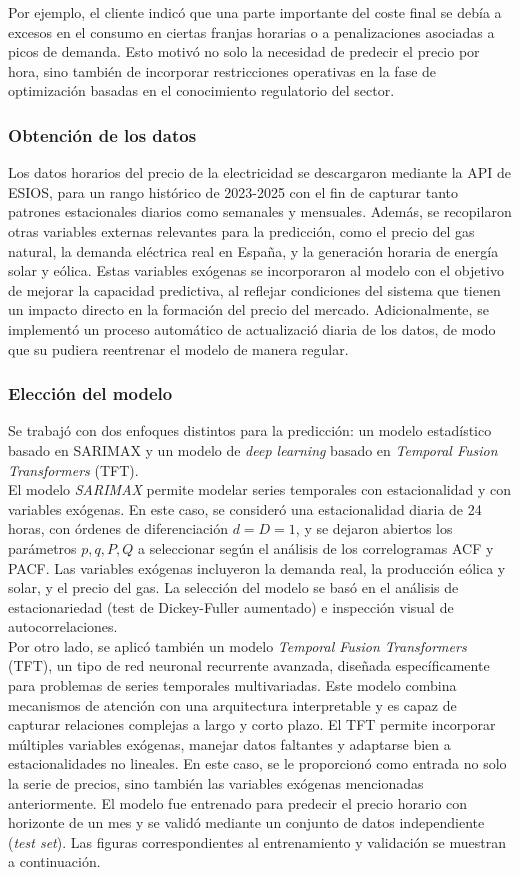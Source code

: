 Por ejemplo, el cliente indicó que una parte importante del coste final se debía a excesos en el consumo en ciertas franjas horarias o a penalizaciones asociadas a picos de demanda. Esto motivó no solo la necesidad de predecir el precio por hora, sino también de incorporar restricciones operativas en la fase de optimización basadas en el conocimiento regulatorio del sector.
%
%
%
\subsubsection{Obtención de los datos}
%
%
%
Los datos horarios del precio de la electricidad se descargaron mediante la API de ESIOS, para un rango histórico de 2023-2025 con el fin de capturar tanto patrones estacionales diarios como semanales y mensuales. Además, se recopilaron otras variables externas relevantes para la predicción, como el precio del gas natural, la demanda eléctrica real en España, y la generación horaria de energía solar y eólica. Estas variables exógenas se incorporaron al modelo con el objetivo de mejorar la capacidad predictiva, al reflejar condiciones del sistema que tienen un impacto directo en la formación del precio del mercado. Adicionalmente, se implementó un proceso automático de actualizació diaria de los datos, de modo que su pudiera reentrenar el modelo de manera regular.
%
%
%
\subsubsection{Elección del modelo}
%
%
%
Se trabajó con dos enfoques distintos para la predicción: un modelo estadístico basado en SARIMAX y un modelo de \textit{deep learning} basado en \textit{Temporal Fusion Transformers} (TFT).\\

El modelo \textit{SARIMAX} permite modelar series temporales con estacionalidad y con variables exógenas. En este caso, se consideró una estacionalidad diaria de 24 horas, con órdenes de diferenciación \(d = D = 1\), y se dejaron abiertos los parámetros \(p, q, P, Q\) a seleccionar según el análisis de los correlogramas ACF y PACF. Las variables exógenas incluyeron la demanda real, la producción eólica y solar, y el precio del gas. La selección del modelo se basó en el análisis de estacionariedad (test de Dickey-Fuller aumentado) e inspección visual de autocorrelaciones.\\

Por otro lado, se aplicó también un modelo \textit{Temporal Fusion Transformers} (TFT), un tipo de red neuronal recurrente avanzada, diseñada específicamente para problemas de series temporales multivariadas. Este modelo combina mecanismos de atención con una arquitectura interpretable y es capaz de capturar relaciones complejas a largo y corto plazo. El TFT permite incorporar múltiples variables exógenas, manejar datos faltantes y adaptarse bien a estacionalidades no lineales. En este caso, se le proporcionó como entrada no solo la serie de precios, sino también las variables exógenas mencionadas anteriormente. El modelo fue entrenado para predecir el precio horario con horizonte de un mes y se validó mediante un conjunto de datos independiente (\textit{test set}). Las figuras correspondientes al entrenamiento y validación se muestran a continuación.
%
%
%

